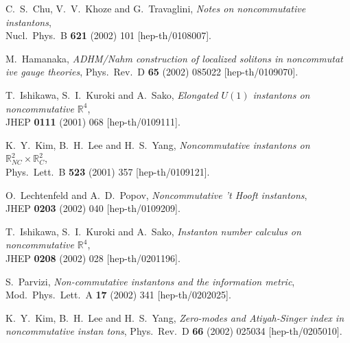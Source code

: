 \documentclass[a4paper,11pt,english]{article}
\numberwithin{equation}{section}
\renewcommand{\=}{\ =\ }
\begin{document}
\begin{thebibliography}{99}
         C.~S.~Chu, V.~V.~Khoze and G.~Travaglini,
         {\em Notes on noncommutative instantons},\\
         Nucl.\ Phys.\ B {\bf 621} (2002) 101
         [hep-th/0108007].

         M.~Hamanaka,
         {\em ADHM/Nahm construction of localized solitons in noncommutat%
ive gauge theories},
         Phys.\ Rev.\ D {\bf 65} (2002) 085022
         [hep-th/0109070].

         T.~Ishikawa, S.~I.~Kuroki and A.~Sako,
         {\em Elongated $U(1)$ instantons on noncommutative $\mathbb{R}^4%
$},\\
         JHEP {\bf 0111} (2001) 068
         [hep-th/0109111].

         K.~Y.~Kim, B.~H.~Lee and H.~S.~Yang,
         {\em Noncommutative instantons on 
              $\mathbb{R}^2_{NC}{\times}\mathbb{R}^2_C$},\\
         Phys.\ Lett.\ B {\bf 523} (2001) 357
         [hep-th/0109121].

         O.~Lechtenfeld and A.~D.~Popov,
         {\em Noncommutative 't Hooft instantons},\\
         JHEP {\bf 0203} (2002) 040
         [hep-th/0109209].

         T.~Ishikawa, S.~I.~Kuroki and A.~Sako,
         {\em Instanton number calculus on noncommutative $\mathbb{R}^4$},\\
         JHEP {\bf 0208} (2002) 028
         [hep-th/0201196].

         S.~Parvizi,
         {\em Non-commutative instantons and the information metric},\\
         Mod.\ Phys.\ Lett.\ A {\bf 17} (2002) 341
         [hep-th/0202025].

         K.~Y.~Kim, B.~H.~Lee and H.~S.~Yang,
         {\em Zero-modes and Atiyah-Singer index in noncommutative instan%
tons},
         Phys.\ Rev.\ D {\bf 66} (2002) 025034
         [hep-th/0205010].


\end{thebibliography}
\end{document}
